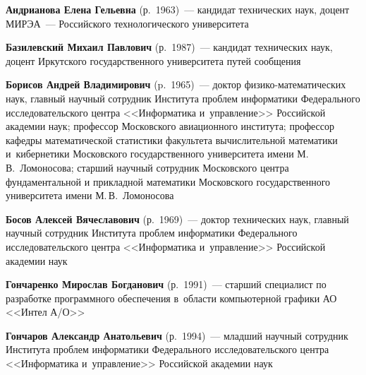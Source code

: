 \begin{multicols}{2}



\noindent
\textbf{Андрианова Елена Гельевна} (р.\ 1963)~--- 
кандидат технических наук, доцент МИРЭА~--- Российского технологического университета

\vspace*{3pt}

\noindent
\textbf{Базилевский Михаил Павлович} (р.\ 1987)~--- 
кандидат технических наук, доцент Иркутского государственного университета путей сообщения




\vspace*{3pt}

\noindent
\textbf{Борисов Андрей Владимирович} (p.\ 1965)~--- доктор 
фи\-зи\-ко-ма\-те\-ма\-ти\-че\-ских наук, главный научный сотрудник Института проб\-лем 
информатики Федерального исследовательского центра <<Информатика и~управ\-ле\-ние>> 
Российской академии наук; профессор Московского авиационного института; профессор кафедры математической 
статистики факультета вычислительной математики и~кибернетики Московского государственного 
 университета имени М.\,В.~Ломоносова; старший научный сотрудник
 Московского цент\-ра фундаментальной и прикладной математики Московского государственного 
 университета имени М.\,В.~Ломоносова
 
 \vspace*{3pt}

\noindent
\textbf{Босов Алексей Вячеславович} (р.\ 1969)~--- 
доктор технических наук, главный научный сотрудник Института проб\-лем 
информатики Федерального исследовательского центра <<Информатика и~управ\-ле\-ние>>
Российской академии наук

 
 \vspace*{3pt}
 
\noindent
\textbf{Гончаренко Мирослав Богданович} (р.\ 1991)~--- 
старший специалист по разработке программного обеспечения в~об\-ласти компьютерной графики АО <<Интел А/О>>



\vspace*{3pt}

\noindent
\textbf{Гончаров Александр Анатольевич} (р.\ 1994)~---
млад\-ший научный сотрудник Института \mbox{проб\-лем} информатики Федерального исследовательского цент\-ра 
<<Информатика и~управ\-ле\-ние>> Российской академии наук


\vspace*{3pt}


\end{multicols}
